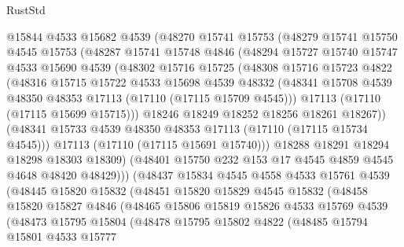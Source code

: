 \begin{lexlean}{RustStd}
\begin{coremodule}
          @15844
          @4533
          @15682
          @4539
          (@48270
            @15741
            @15753
            (@48279
              @15741
              @15750
              @4545
              @15753
              (@48287
                @15741
                @15748
                @4846
                (@48294
                  @15727
                  @15740
                  @15747
                  @4533
                  @15690
                  @4539
                  (@48302
                    @15716
                    @15725
                    (@48308
                      @15716
                      @15723
                      @4822
                      (@48316
                        @15715
                        @15722
                        @4533
                        @15698
                        @4539
                        @48332
                        (@48341 @15708 @4539 @48350 @48353 @17113 (@17110 (@17115 @15709 @4545)))
                        @17113
                        (@17110 (@17115 @15699 @15715)))
                      @18246
                      @18249
                      @18252
                      @18256
                      @18261
                      @18267))
                  (@48341 @15733 @4539 @48350 @48353 @17113 (@17110 (@17115 @15734 @4545)))
                  @17113
                  (@17110 (@17115 @15691 @15740)))
                @18288
                @18291
                @18294
                @18298
                @18303
                @18309)
              (@48401 @15750 @232 @153 @17 @4545 @4859 @4545 @4648 @48420 @48429)))
          (@48437
            @15834
            @4545
            @4558
            @4533
            @15761
            @4539
            (@48445
              @15820
              @15832
              (@48451
                @15820
                @15829
                @4545
                @15832
                (@48458
                  @15820
                  @15827
                  @4846
                  (@48465
                    @15806
                    @15819
                    @15826
                    @4533
                    @15769
                    @4539
                    (@48473
                      @15795
                      @15804
                      (@48478
                        @15795
                        @15802
                        @4822
                        (@48485
                          @15794
                          @15801
                          @4533
                          @15777

\end{coremodule}
\end{lexlean}
